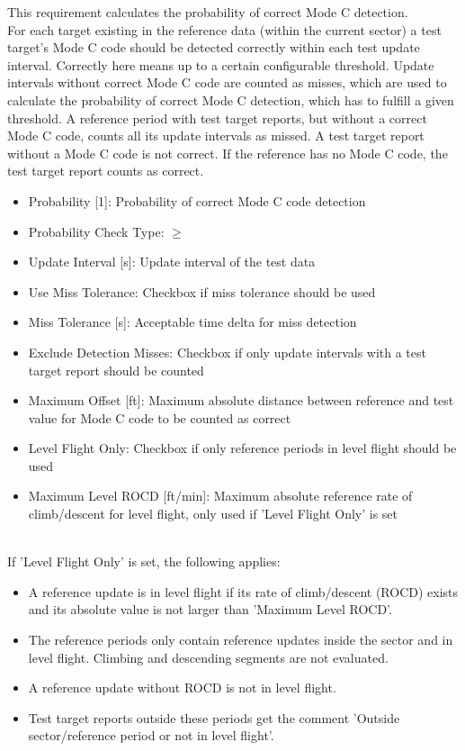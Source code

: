 This requirement calculates the probability of correct Mode C detection. \\

For each target existing in the reference data (within the current sector) a test target's Mode C code should
be detected correctly within each test update interval. Correctly here means up to a certain configurable threshold.
Update intervals without correct Mode C code are counted as misses, which are used to calculate the probability of correct Mode C
detection, which has to fulfill a given threshold.
A reference period with test target reports, but without a correct Mode C code, counts all its update intervals as missed. A test target report without a Mode C code is not correct. If the reference has no Mode C code, the test target report counts as correct.

\begin{itemize}  
    \item Probability [1]: Probability of correct Mode C code detection
    \item Probability Check Type: $\geq$
    \item Update Interval [s]: Update interval of the test data
    \item Use Miss Tolerance: Checkbox if miss tolerance should be used
    \item Miss Tolerance [s]: Acceptable time delta for miss detection
    \item Exclude Detection Misses: Checkbox if only update intervals with a test target report should be counted
    \item Maximum Offset [ft]: Maximum absolute distance between reference and test value for Mode C code to be counted as correct
    \item Level Flight Only: Checkbox if only reference periods in level flight should be used
    \item Maximum Level ROCD [ft/min]: Maximum absolute reference rate of climb/descent for level flight, only used if 'Level Flight Only' is set
\end{itemize}
\ \\

If 'Level Flight Only' is set, the following applies:
\begin{itemize}
    \item A reference update is in level flight if its rate of climb/descent (ROCD) exists and its absolute value is not larger than 'Maximum Level ROCD'.
    \item The reference periods only contain reference updates inside the sector and in level flight. Climbing and descending segments are not evaluated.
    \item A reference update without ROCD is not in level flight.
    \item Test target reports outside these periods get the comment 'Outside sector/reference period or not in level flight'.
\end{itemize}
\ \\

